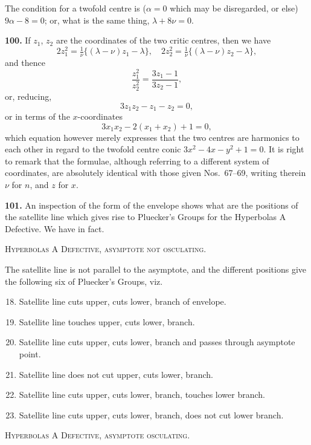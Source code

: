 \documentclass[11pt,a4paper]{article}
\theoremstyle{plain}
\begin{document}
The condition for a twofold centre is ($\alpha = 0$ which may be disregarded, or else) $9\alpha - 8 = 0$; or, what is the same thing, $\lambda + 8\nu = 0$.

\noindent\textbf{100.} If $z_1$, $z_2$ are the coordinates of the two critic centres, then we have
\[
2z_1^2 = \tfrac{1}{\nu}\{(\lambda - \nu)z_1 - \lambda\}, \quad 2z_2^2 = \tfrac{1}{\nu}\{(\lambda - \nu)z_2 - \lambda\},
\]
and thence
\[
\frac{z_1^2}{z_2^2} = \frac{3z_1 - 1}{3z_2 - 1},
\]
or, reducing,
\[
3z_1z_2 - z_1 - z_2 = 0,
\]
or in terms of the $x$-coordinates
\[
3x_1x_2 - 2(x_1 + x_2) + 1 = 0,
\]
which equation however merely expresses that the two centres are harmonics to each other in regard to the twofold centre conic $3x^2 - 4x - y^2 + 1 = 0$. It is right to remark that the formulae, although referring to a different system of coordinates, are absolutely identical with those given Nos.~67--69, writing therein $\nu$ for $n$, and $z$ for $x$.

\noindent\textbf{101.} An inspection of the form of the envelope shows what are the positions of the satellite line which gives rise to Pluecker's Groups for the Hyperbolas A Defective. We have in fact.

\textsc{Hyperbolas A Defective, asymptote not osculating.}

The satellite line is not parallel to the asymptote, and the different positions give the following six of Pluecker's Groups, viz.
\begin{enumerate}[label=\textsc{\Roman*.},nosep]
\setcounter{enumi}{17}
\item Satellite line cuts upper, cuts lower, branch of envelope.
\item Satellite line touches upper, cuts lower, branch.
\item Satellite line cuts upper, cuts lower, branch and passes through asymptote point.
\item Satellite line does not cut upper, cuts lower, branch.
\item Satellite line cuts upper, cuts lower, branch, touches lower branch.
\item Satellite line cuts upper, cuts lower, branch, does not cut lower branch.
\end{enumerate}

\textsc{Hyperbolas A Defective, asymptote osculating.}
\end{document}
